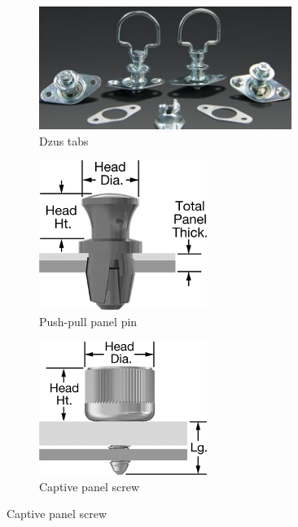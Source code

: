 \documentclass[10pt,letterpaper]{book}
\begin{document}
	\begin{figure}[H]
		\begin{subfigure}[b]{.35\linewidth}
			\includegraphics[width=0.9\textwidth]{imgs/dzus_tabs.jpeg}
			\caption{Dzus tabs}
		\end{subfigure}
		\begin{subfigure}[b]{.3\linewidth}
			\includegraphics[width=0.6\textwidth]{imgs/pushpull_panel_screw.png}
			\caption{Push-pull panel pin}
		\end{subfigure}
		\begin{subfigure}[b]{.3\linewidth}
			\includegraphics[width=0.6\textwidth]{imgs/panel_screw.png}
			\caption{Captive panel screw}
		\end{subfigure}
	\end{figure}
	
\end{document}
